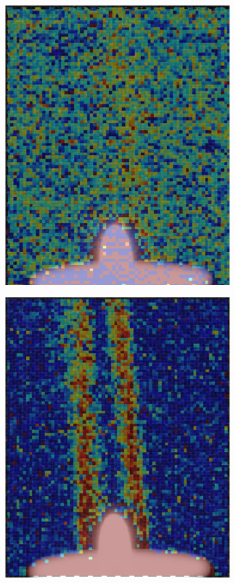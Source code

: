 \documentclass[letterpaper,12pt]{article}
\begin{document}
\begin{figure}[h]
\begin{subfigure}[b]{0.3\textwidth}
        \includegraphics[width=0.95\textwidth]{Plot_Y_Displacement.PNG}
        \caption{}
        \label{fig:Plot_Y_Displacement}
    \end{subfigure}
    \begin{subfigure}[b]{0.3\textwidth}
    	\centering
        \includegraphics[width=0.95\textwidth]{Plot_Total_Displacement.PNG}

\end{subfigure}
\end{figure}
\end{document}
